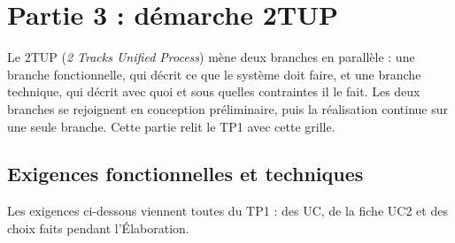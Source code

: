 \documentclass[11pt,a4paper]{article}
\begin{document}
\clearpage
\section{Partie 3 : démarche 2TUP}

Le 2TUP (\emph{2 Tracks Unified Process}) mène deux branches en parallèle : une
branche fonctionnelle, qui décrit ce que le système doit faire, et une branche
technique, qui décrit avec quoi et sous quelles contraintes il le fait. Les deux
branches se rejoignent en conception préliminaire, puis la réalisation continue sur
une seule branche. Cette partie relit le TP1 avec cette grille.

\subsection{Exigences fonctionnelles et techniques}

Les exigences ci-dessous viennent toutes du TP1 : des UC, de la fiche UC2 et des
choix faits pendant l'Élaboration.
\end{document}
